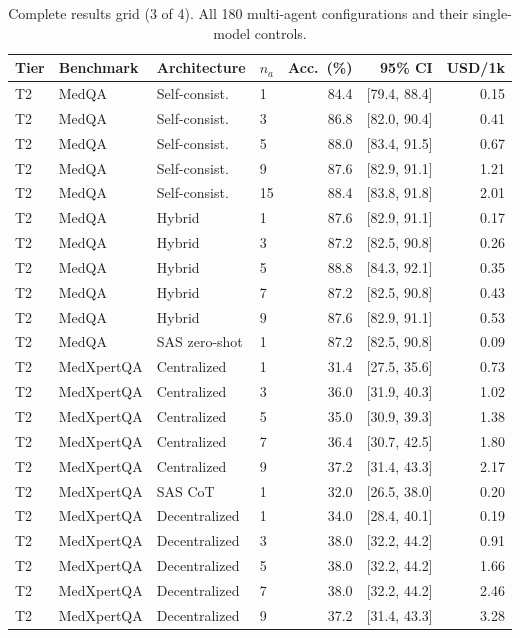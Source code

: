 \begin{table}[t]\centering\scriptsize
\caption{Complete results grid (3 of 4). All 180 multi-agent configurations and their single-model controls.}
\begin{tabular}{@{}llllrrr@{}}
\toprule
Tier & Benchmark & Architecture & $n_a$ & Acc.\ (\%) & 95\% CI & USD/1k \\
\midrule
T2 & MedQA & Self-consist. & 1 & 84.4 & [79.4, 88.4] & 0.15 \\
T2 & MedQA & Self-consist. & 3 & 86.8 & [82.0, 90.4] & 0.41 \\
T2 & MedQA & Self-consist. & 5 & 88.0 & [83.4, 91.5] & 0.67 \\
T2 & MedQA & Self-consist. & 9 & 87.6 & [82.9, 91.1] & 1.21 \\
T2 & MedQA & Self-consist. & 15 & 88.4 & [83.8, 91.8] & 2.01 \\
T2 & MedQA & Hybrid & 1 & 87.6 & [82.9, 91.1] & 0.17 \\
T2 & MedQA & Hybrid & 3 & 87.2 & [82.5, 90.8] & 0.26 \\
T2 & MedQA & Hybrid & 5 & 88.8 & [84.3, 92.1] & 0.35 \\
T2 & MedQA & Hybrid & 7 & 87.2 & [82.5, 90.8] & 0.43 \\
T2 & MedQA & Hybrid & 9 & 87.6 & [82.9, 91.1] & 0.53 \\
T2 & MedQA & SAS zero-shot & 1 & 87.2 & [82.5, 90.8] & 0.09 \\
T2 & MedXpertQA & Centralized & 1 & 31.4 & [27.5, 35.6] & 0.73 \\
T2 & MedXpertQA & Centralized & 3 & 36.0 & [31.9, 40.3] & 1.02 \\
T2 & MedXpertQA & Centralized & 5 & 35.0 & [30.9, 39.3] & 1.38 \\
T2 & MedXpertQA & Centralized & 7 & 36.4 & [30.7, 42.5] & 1.80 \\
T2 & MedXpertQA & Centralized & 9 & 37.2 & [31.4, 43.3] & 2.17 \\
T2 & MedXpertQA & SAS CoT & 1 & 32.0 & [26.5, 38.0] & 0.20 \\
T2 & MedXpertQA & Decentralized & 1 & 34.0 & [28.4, 40.1] & 0.19 \\
T2 & MedXpertQA & Decentralized & 3 & 38.0 & [32.2, 44.2] & 0.91 \\
T2 & MedXpertQA & Decentralized & 5 & 38.0 & [32.2, 44.2] & 1.66 \\
T2 & MedXpertQA & Decentralized & 7 & 38.0 & [32.2, 44.2] & 2.46 \\
T2 & MedXpertQA & Decentralized & 9 & 37.2 & [31.4, 43.3] & 3.28 \\

\end{tabular}
\end{table}
